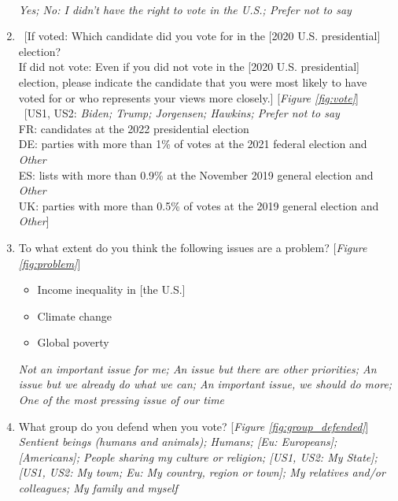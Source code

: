 \begin{enumerate}[resume]
\\ \textit{Yes; No: I didn't have the right to vote in the U.S.; Prefer not to say}
\item \label{q:vote} ~[If voted: Which candidate did you vote for in the [2020 U.S. presidential] election? \\ If did not vote: Even if you did not vote in the [2020 U.S. presidential] election, please indicate the candidate that you were most likely to have voted for or who represents your views more closely.] [\textit{Figure \ref{fig:vote}}]
\\ ~[US1, US2: \textit{Biden; Trump; Jorgensen; Hawkins; Prefer not to say}\\ FR: candidates at the 2022 presidential election\\ DE: parties with more than 1\% of votes at the 2021 federal election and \textit{Other}\\ ES: lists with more than 0.9\% at the November 2019 general election and \textit{Other}\\ UK: parties with more than 0.5\% of votes at the 2019 general election and \textit{Other}]
\item \label{q:problem} To what extent do you think the following issues are a problem? [\textit{Figure \ref{fig:problem}}]
\begin{itemize}
    \item Income inequality in [the U.S.] 
    \item Climate change
    \item Global poverty
\end{itemize}
\textit{Not an important issue for me; An issue but there are other priorities; An issue but we already do what we can; An important issue, we should do more; One of the most pressing issue of our time}
\item \label{q:group_defended} What group do you defend when you vote? [\textit{Figure \ref{fig:group_defended}}]
\\ \textit{Sentient beings (humans and animals); Humans; [Eu: Europeans]; [Americans]; People sharing my culture or religion; [US1, US2: My State]; [US1, US2: My town; Eu: My country, region or town]; My relatives and/or colleagues; My family and myself}
\end{enumerate}


